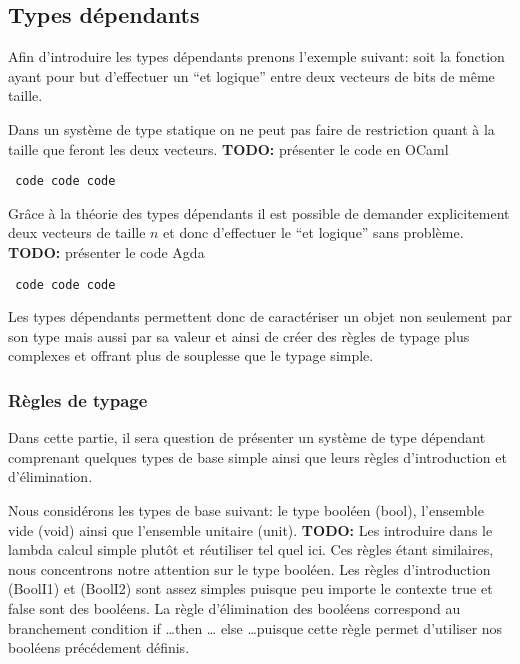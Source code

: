 \documentclass{article}
\newcommand{\TODO}[1]{\textbf{TODO:} #1}
\theoremstyle{definition}
\theoremstyle{remark}
\begin{document}
\subsection{Types dépendants}

Afin d'introduire les types dépendants prenons l'exemple suivant: soit
la fonction ayant pour but d'effectuer un ``et logique'' entre deux
vecteurs de bits de même taille.

Dans un système de type statique on ne peut pas faire de restriction
quant à la taille que feront les deux vecteurs.  
\TODO{présenter le code en OCaml}

\begin{verbatim}
 code code code
\end{verbatim}

Grâce à la théorie des types dépendants il est possible de demander
explicitement deux vecteurs de taille \(n\) et donc d'effectuer le
``et logique'' sans problème. 
\TODO{présenter le code Agda}

\begin{verbatim}
 code code code
\end{verbatim}


Les types dépendants permettent donc de caractériser un objet non
seulement par son type mais aussi par sa valeur et ainsi de créer des
règles de typage plus complexes et offrant plus de souplesse que le
typage simple.

\subsubsection{Règles de typage}

Dans cette partie, il sera question de présenter un système de type
dépendant comprenant quelques types de base simple ainsi que leurs
règles d'introduction et d'élimination.

Nous considérons les types de base suivant: le type booléen
(\textsf{bool}), l'ensemble vide (\textsf{void}) ainsi que l'ensemble
unitaire (\textsf{unit}). \TODO{Les introduire dans le lambda calcul
  simple plutôt et réutiliser tel quel ici.} Ces règles étant
similaires, nous concentrons notre attention sur le type booléen. Les
règles d'introduction (BoolI1) et (BoolI2) sont assez simples puisque
peu importe le contexte \textsf{true} et \textsf{false} sont des
booléens.  La règle d'élimination des booléens correspond au
branchement condition \textsf{if} \ldots \textsf{then} \ldots
\textsf{else} \ldots puisque cette règle permet d'utiliser nos
booléens précédement définis.
\end{document}
